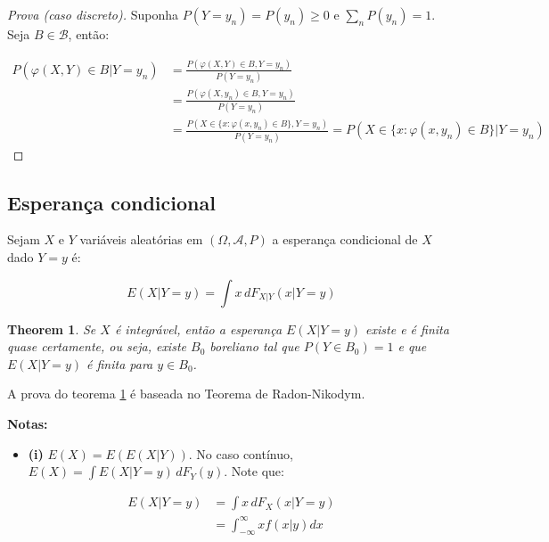 \documentclass[
]{article}
\providecommand{\tightlist}{%
  \setlength{\itemsep}{0pt}\setlength{\parskip}{0pt}}
\newtheorem{theorem}{Theorem}[section]
\theoremstyle{definition}
\theoremstyle{definition}
\theoremstyle{definition}
\theoremstyle{definition}
\theoremstyle{remark}
\begin{document}
\begin{proof}[Prova (caso discreto)]
Suponha \(P(Y = y_{n}) = P(y_{n}) \ge 0\) e \(\sum_{n}P(y_{n}) = 1\). Seja \(B \in \mathcal{B}\), então:

\begin{align*}
P(\varphi(X,Y) \in B|Y = y_{n}) &= \frac{P(\varphi(X,Y) \in B, Y = y_{n})}{P(Y = y_{n})} \\
&= \frac{P(\varphi(X,y_{n}) \in B, Y = y_{n})}{P(Y = y_{n})} \\
&= \frac{P(X \in \{x : \varphi(x,y_{n}) \in B\},Y = y_{n})}{P(Y = y_{n})} = P(X \in \{x : \varphi(x,y_{n}) \in B\}|Y = y_{n})
\end{align*}
\end{proof}

\hypertarget{esperanuxe7a-condicional}{%
\subsection{Esperança condicional}\label{esperanuxe7a-condicional}}

Sejam \(X\) e \(Y\) variáveis aleatórias em \((\Omega, \mathcal{A}, P)\) a esperança condicional de \(X\) dado \(Y = y\) é:

\begin{equation*}
E(X|Y = y) = \int x \, dF_{X|Y}(x|Y = y)
\end{equation*}

\begin{theorem}
\protect\hypertarget{thm:integrabespcond}{}\label{thm:integrabespcond}Se \(X\) é integrável, então a esperança \(E(X|Y = y)\) existe e é finita quase certamente, ou seja, existe \(B_{0}\) boreliano tal que \(P(Y \in B_{0}) = 1\) e que \(E(X|Y = y)\) é finita para \(y \in B_{0}\).
\end{theorem}

A prova do teorema \ref{thm:integrabespcond} é baseada no Teorema de Radon-Nikodym.

\textbf{Notas:}

\begin{itemize}
\tightlist
\item
  \textbf{(i)} \(E(X) = E(E(X|Y))\). No caso contínuo, \(E(X) = \int E(X|Y = y)\, dF_{Y}(y)\). Note que:
\end{itemize}

\begin{align*}
E(X|Y = y) &= \int x \, dF_{X}(x|Y = y) \\
&= \int_{-\infty}^{\infty}xf(x|y)dx
\end{align*}
\end{document}
